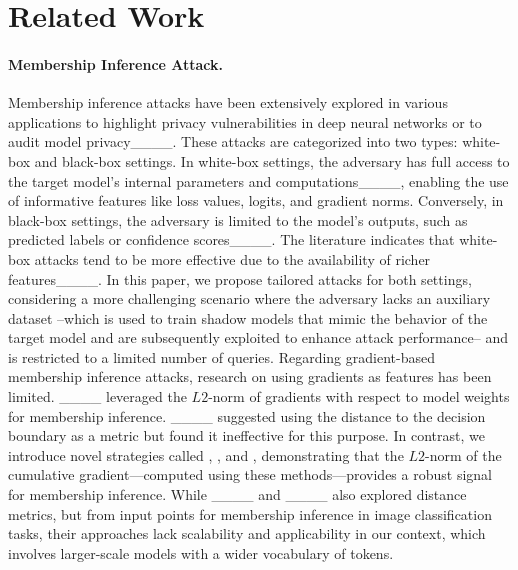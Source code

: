 \section{Related Work}
\label{sec:related_work}
\vspace{-0.15in}

\paragraph{Membership Inference Attack.} 
Membership inference attacks have been extensively explored in various applications to highlight privacy vulnerabilities in deep neural networks or to audit model privacy____. These attacks are categorized into two types: white-box and black-box settings. In white-box settings, the adversary has full access to the target model's internal parameters and computations____, enabling the use of informative features like loss values, logits, and gradient norms. Conversely, in black-box settings, the adversary is limited to the model's outputs, such as predicted labels or confidence scores____. The literature indicates that white-box attacks tend to be more effective due to the availability of richer features____. In this paper, we propose tailored attacks for both settings, considering a more challenging scenario where the adversary lacks an auxiliary dataset --which is used to train shadow models that mimic the behavior of the target model and are subsequently exploited to enhance attack performance-- and is restricted to a limited number of queries. Regarding gradient-based membership inference attacks, research on using gradients as features has been limited. ____ leveraged the $L2$-norm of gradients with respect to model weights for membership inference. ____ suggested using the distance to the decision boundary as a metric but found it ineffective for this purpose. In contrast, we introduce novel strategies called \atkFL, \atkFLLoRA, and \atkIG, demonstrating that the $L2$-norm of the cumulative gradient—computed using these methods—provides a robust signal for membership inference. While ____ and ____ also explored distance metrics, but from input points for membership inference in image classification tasks, their approaches lack scalability and applicability in our context, which involves larger-scale models with a wider vocabulary of tokens.

